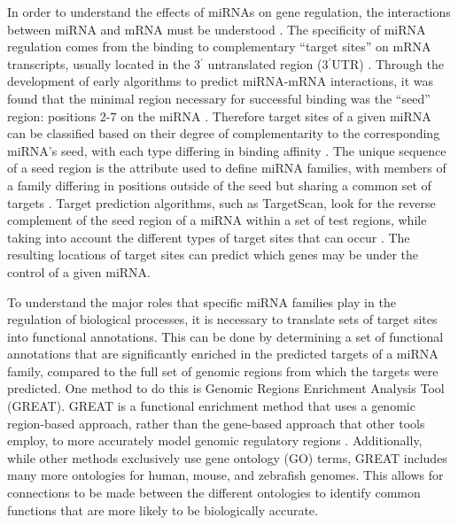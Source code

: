 \documentclass[12pt]{article}
\begin{document}
In order to understand the effects of miRNAs on gene regulation, the interactions between miRNA and mRNA must be understood \cite{agarwal2015predicting}. The specificity of miRNA regulation comes from the binding to complementary ``target sites'' on mRNA transcripts, usually located in the 3$^\prime$ untranslated region (3$^\prime$UTR) \cite{bartel2009micrornas}. Through the development of early algorithms to predict miRNA-mRNA interactions, it was found that the minimal region necessary for successful binding was the ``seed'' region: positions 2-7 on the miRNA \cite{bartel2009micrornas}. Therefore target sites of a given miRNA can be classified based on their degree of complementarity to the corresponding miRNA’s seed, with each type differing in binding affinity \cite{bartel2009micrornas}. The unique sequence of a seed region is the attribute used to define miRNA families, with members of a family differing in positions outside of the seed but sharing a common set of targets \cite{bartel2009micrornas}. Target prediction algorithms, such as TargetScan, look for the reverse complement of the seed region of a miRNA within a set of test regions, while taking into account the different types of target sites that can occur \cite{lewis2005conserved}. The resulting locations of target sites can predict which genes may be under the control of a given miRNA.

To understand the major roles that specific miRNA families play in the regulation of biological processes, it is necessary to translate sets of target sites into functional annotations. This can be done by determining a set of functional annotations that are significantly enriched in the predicted targets of a miRNA family, compared to the full set of genomic regions from which the targets were predicted. One method to do this is Genomic Regions Enrichment Analysis Tool (GREAT). GREAT is a functional enrichment method that uses a genomic region-based approach, rather than the gene-based approach that other tools employ, to more accurately model genomic regulatory regions \cite{hiller2013computational}. Additionally, while other methods exclusively use gene ontology (GO) terms, GREAT includes many more ontologies for human, mouse, and zebrafish genomes. This allows for connections to be made between the different ontologies to identify common functions that are more likely to be biologically accurate.
\end{document}
